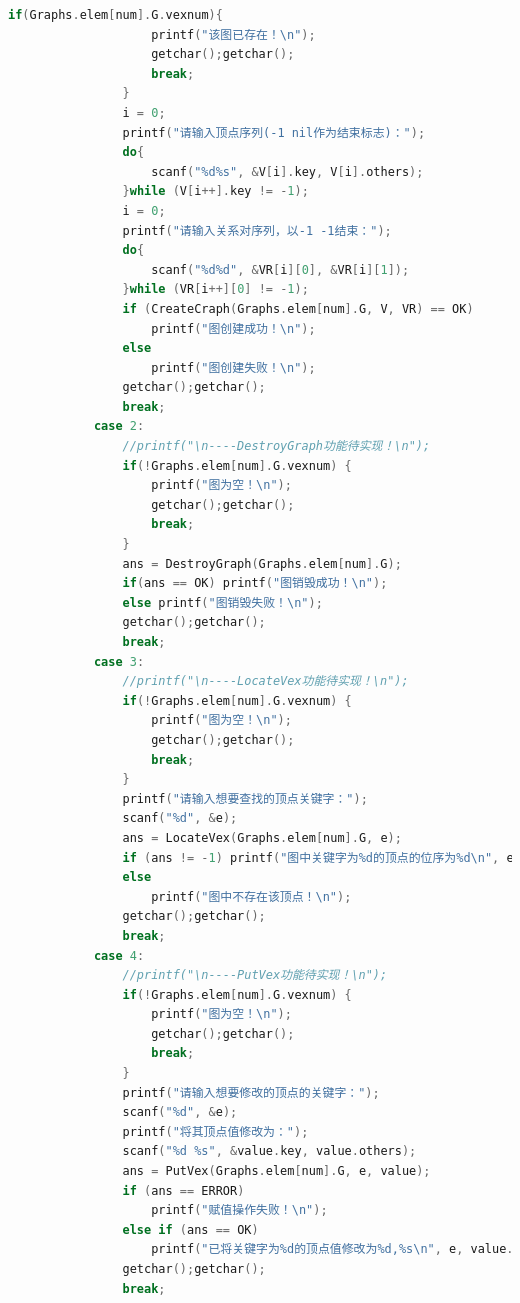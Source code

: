 \documentclass[supercite]{Experimental_Report}
\theoremstyle{definition}
\begin{document}
\begin{lstlisting}[language=c]
                if(Graphs.elem[num].G.vexnum){
                    printf("该图已存在！\n");
                    getchar();getchar();
                    break;
                }
                i = 0;
	            printf("请输入顶点序列(-1 nil作为结束标志)：");
	            do{
	                scanf("%d%s", &V[i].key, V[i].others);
	            }while (V[i++].key != -1);
	            i = 0;
	            printf("请输入关系对序列，以-1 -1结束：");
	            do{
	                scanf("%d%d", &VR[i][0], &VR[i][1]);
	            }while (VR[i++][0] != -1);
	            if (CreateCraph(Graphs.elem[num].G, V, VR) == OK)
	                printf("图创建成功！\n");
	            else
	                printf("图创建失败！\n");
                getchar();getchar();
                break;
            case 2:
                //printf("\n----DestroyGraph功能待实现！\n");
                if(!Graphs.elem[num].G.vexnum) {
                    printf("图为空！\n");
                    getchar();getchar();
                    break;
                }
                ans = DestroyGraph(Graphs.elem[num].G);
                if(ans == OK) printf("图销毁成功！\n");
                else printf("图销毁失败！\n");
                getchar();getchar();
                break;    
            case 3:
                //printf("\n----LocateVex功能待实现！\n");
                if(!Graphs.elem[num].G.vexnum) {
                    printf("图为空！\n");
                    getchar();getchar();
                    break;
                }
				printf("请输入想要查找的顶点关键字：");
	            scanf("%d", &e);
	            ans = LocateVex(Graphs.elem[num].G, e);
	            if (ans != -1) printf("图中关键字为%d的顶点的位序为%d\n", e, ans);
	            else
	                printf("图中不存在该顶点！\n");
                getchar();getchar();
                break;
           	case 4:
                //printf("\n----PutVex功能待实现！\n");
                if(!Graphs.elem[num].G.vexnum) {
                    printf("图为空！\n");
                    getchar();getchar();
                    break;
                }
				printf("请输入想要修改的顶点的关键字：");
                scanf("%d", &e);
	            printf("将其顶点值修改为：");
	            scanf("%d %s", &value.key, value.others);
	            ans = PutVex(Graphs.elem[num].G, e, value);
	            if (ans == ERROR)
	                printf("赋值操作失败！\n");
	            else if (ans == OK)
	                printf("已将关键字为%d的顶点值修改为%d,%s\n", e, value.key, value.others);
                getchar();getchar();
                break;

\end{lstlisting}
\end{document}
